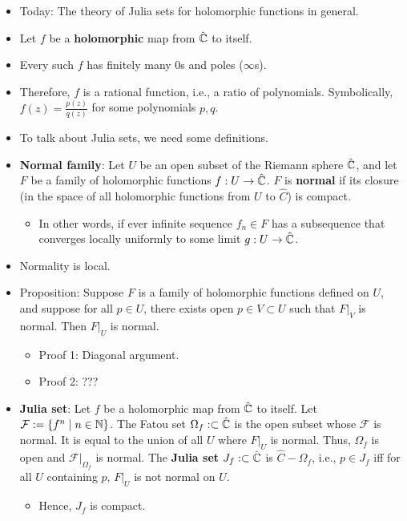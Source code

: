 \documentclass[../apprentice.tex]{subfiles}
\begin{document}
\begin{itemize}
\begin{itemize}
    \end{itemize}
    \item Today: The theory of Julia sets for holomorphic functions in general.
    \item Let $f$ be a \textbf{holomorphic} map from $\hat{\mathbb{C}}$ to itself.
    \item Every such $f$ has finitely many 0s and poles ($\infty$s).
    \item Therefore, $f$ is a rational function, i.e., a ratio of polynomials. Symbolically, $f(z)=\frac{p(z)}{q(z)}$ for some polynomials $p,q$.
    \item To talk about Julia sets, we need some definitions.
    \item \textbf{Normal family}: Let $U$ be an open subset of the Riemann sphere $\hat{\mathbb{C}}$, and let $F$ be a family of holomorphic functions $f:U\to\hat{\mathbb{C}}$. $F$ is \textbf{normal} if its closure (in the space of all holomorphic functions from $U$ to $\hat{C}$) is compact.
    \begin{itemize}
        \item In other words, if ever infinite sequence $f_n\in F$ has a subsequence that converges locally uniformly to some limit $g:U\to\hat{\mathbb{C}}$.
    \end{itemize}
    \item Normality is local.
    \item Proposition: Suppose $F$ is a family of holomorphic functions defined on $U$, and suppose for all $p\in U$, there exists open $p\in V\subset U$ such that $F|_V$ is normal. Then $F|_U$ is normal.
    \begin{itemize}
        \item Proof 1: Diagonal argument.
        \item Proof 2: ???
    \end{itemize}
    \item \textbf{Julia set}: Let $f$ be a holomorphic map from $\hat{\mathbb{C}}$ to itself. Let $\mathcal{F}:=\{f^n\mid n\in\mathbb{N}\}$. The Fatou set $\Omega_f:\subset\hat{\mathbb{C}}$ is the open subset whose $\mathcal{F}$ is normal. It is equal to the union of all $U$ where $F|_U$ is normal. Thus, $\Omega_f$ is open and $\mathcal{F}|_{\Omega_f}$ is normal. The \textbf{Julia set} $J_f:\subset\hat{\mathbb{C}}$ is $\hat{C}-\Omega_f$, i.e., $p\in J_f$ iff for all $U$ containing $p$, $F|_U$ is not normal on $U$.
    \begin{itemize}
        \item Hence, $J_f$ is compact.
    \end{itemize}

\end{itemize}
\end{document}

